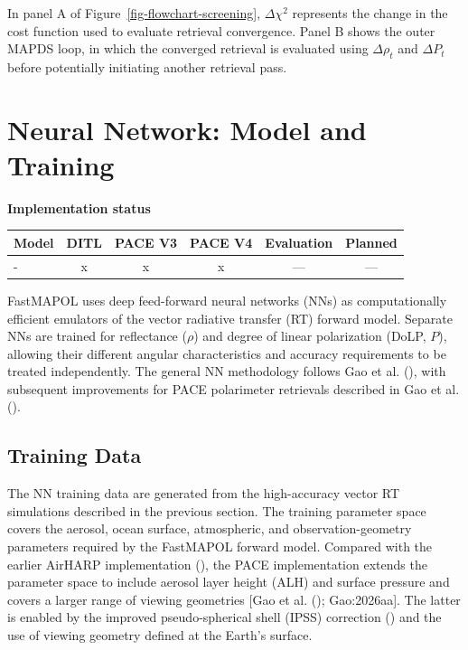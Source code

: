 \documentclass[
  11pt,
  letterpaper,
]{scrreprt}
\begin{document}
In panel A of Figure~\ref{fig-flowchart-screening}, \(\Delta\chi^2\)
represents the change in the cost function used to evaluate retrieval
convergence. Panel B shows the outer MAPDS loop, in which the converged
retrieval is evaluated using \(\Delta\rho_t\) and \(\Delta P_t\) before
potentially initiating another retrieval pass.

\chapter{Neural Network: Model and Training}\label{sec-nn-model}

\textbf{Implementation status}

\begin{longtable}[]{@{}lccccc@{}}
\toprule\noalign{}
Model & DITL & PACE V3 & PACE V4 & Evaluation & Planned \\
\midrule\noalign{}
\endhead
\bottomrule\noalign{}
\endlastfoot
- & x & x & x & --- & --- \\
\end{longtable}

FastMAPOL uses deep feed-forward neural networks (NNs) as
computationally efficient emulators of the vector radiative transfer
(RT) forward model. Separate NNs are trained for reflectance (\(\rho\))
and degree of linear polarization (DoLP, \(P\)), allowing their
different angular characteristics and accuracy requirements to be
treated independently. The general NN methodology follows Gao et al.
(), with subsequent improvements for PACE
polarimeter retrievals described in Gao et al.
().

\section{Training Data}\label{training-data}

The NN training data are generated from the high-accuracy vector RT
simulations described in the previous section. The training parameter
space covers the aerosol, ocean surface, atmospheric, and
observation-geometry parameters required by the FastMAPOL forward model.
Compared with the earlier AirHARP implementation
(), the PACE implementation
extends the parameter space to include aerosol layer height (ALH) and
surface pressure and covers a larger range of viewing geometries {[}Gao
et al. (); Gao:2026aa{]}. The latter is
enabled by the improved pseudo-spherical shell (IPSS) correction
() and the use of viewing
geometry defined at the Earth's surface.
\end{document}
